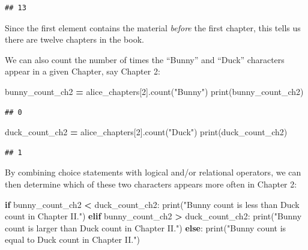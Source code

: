 \documentclass[
]{book}
\newenvironment{Shaded}{\begin{snugshade}}{\end{snugshade}}
\newcommand{\BuiltInTok}[1]{#1}
\newcommand{\ControlFlowTok}[1]{\textcolor[rgb]{0.13,0.29,0.53}{\textbf{#1}}}
\newcommand{\DecValTok}[1]{\textcolor[rgb]{0.00,0.00,0.81}{#1}}
\newcommand{\NormalTok}[1]{#1}
\newcommand{\OperatorTok}[1]{\textcolor[rgb]{0.81,0.36,0.00}{\textbf{#1}}}
\newcommand{\StringTok}[1]{\textcolor[rgb]{0.31,0.60,0.02}{#1}}
\begin{document}
\begin{verbatim}
## 13
\end{verbatim}

Since the first element contains the material \emph{before} the first chapter, this tells us there are twelve chapters in the book.

We can also count the number of times the ``Bunny'' and ``Duck'' characters appear in a given Chapter, say Chapter 2:

\begin{Shaded}
\begin{Highlighting}[]
\NormalTok{bunny\_count\_ch2 }\OperatorTok{=}\NormalTok{ alice\_chapters[}\DecValTok{2}\NormalTok{].count(}\StringTok{"Bunny"}\NormalTok{)}
\BuiltInTok{print}\NormalTok{(bunny\_count\_ch2)}
\end{Highlighting}
\end{Shaded}

\begin{verbatim}
## 0
\end{verbatim}

\begin{Shaded}
\begin{Highlighting}[]
\NormalTok{duck\_count\_ch2 }\OperatorTok{=}\NormalTok{ alice\_chapters[}\DecValTok{2}\NormalTok{].count(}\StringTok{"Duck"}\NormalTok{)}
\BuiltInTok{print}\NormalTok{(duck\_count\_ch2)}
\end{Highlighting}
\end{Shaded}

\begin{verbatim}
## 1
\end{verbatim}

By combining choice statements with logical and/or relational operators, we can then determine which of these two characters
appears more often in Chapter 2:

\begin{Shaded}
\begin{Highlighting}[]
\ControlFlowTok{if}\NormalTok{ bunny\_count\_ch2 }\OperatorTok{\textless{}}\NormalTok{ duck\_count\_ch2:}
    \BuiltInTok{print}\NormalTok{(}\StringTok{"Bunny count is less than Duck count in Chapter II."}\NormalTok{)}
\ControlFlowTok{elif}\NormalTok{ bunny\_count\_ch2 }\OperatorTok{\textgreater{}}\NormalTok{ duck\_count\_ch2:}
    \BuiltInTok{print}\NormalTok{(}\StringTok{"Bunny count is larger than Duck count in Chapter II."}\NormalTok{)}
\ControlFlowTok{else}\NormalTok{:}
    \BuiltInTok{print}\NormalTok{(}\StringTok{"Bunny count is equal to Duck count in Chapter II."}\NormalTok{)}
\end{Highlighting}
\end{Shaded}
\end{document}
